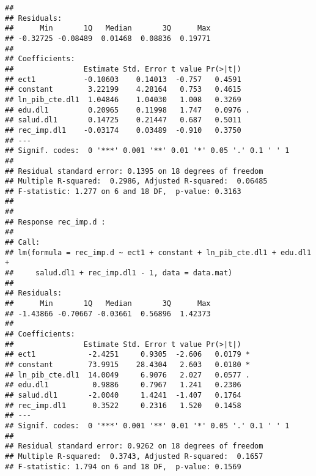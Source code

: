 \documentclass[]{book}
\newenvironment{Shaded}{\begin{snugshade}}{\end{snugshade}}
\newcommand{\KeywordTok}[1]{\textcolor[rgb]{0.13,0.29,0.53}{\textbf{#1}}}
\newcommand{\DecValTok}[1]{\textcolor[rgb]{0.00,0.00,0.81}{#1}}
\newcommand{\StringTok}[1]{\textcolor[rgb]{0.31,0.60,0.02}{#1}}
\newcommand{\OperatorTok}[1]{\textcolor[rgb]{0.81,0.36,0.00}{\textbf{#1}}}
\newcommand{\NormalTok}[1]{#1}
\theoremstyle{definition}
\theoremstyle{definition}
\theoremstyle{definition}
\theoremstyle{remark}
\begin{document}
\begin{verbatim}
## 
## Residuals:
##      Min       1Q   Median       3Q      Max 
## -0.32725 -0.08489  0.01468  0.08836  0.19771 
## 
## Coefficients:
##                Estimate Std. Error t value Pr(>|t|)  
## ect1           -0.10603    0.14013  -0.757   0.4591  
## constant        3.22199    4.28164   0.753   0.4615  
## ln_pib_cte.dl1  1.04846    1.04030   1.008   0.3269  
## edu.dl1         0.20965    0.11998   1.747   0.0976 .
## salud.dl1       0.14725    0.21447   0.687   0.5011  
## rec_imp.dl1    -0.03174    0.03489  -0.910   0.3750  
## ---
## Signif. codes:  0 '***' 0.001 '**' 0.01 '*' 0.05 '.' 0.1 ' ' 1
## 
## Residual standard error: 0.1395 on 18 degrees of freedom
## Multiple R-squared:  0.2986, Adjusted R-squared:  0.06485 
## F-statistic: 1.277 on 6 and 18 DF,  p-value: 0.3163
## 
## 
## Response rec_imp.d :
## 
## Call:
## lm(formula = rec_imp.d ~ ect1 + constant + ln_pib_cte.dl1 + edu.dl1 + 
##     salud.dl1 + rec_imp.dl1 - 1, data = data.mat)
## 
## Residuals:
##      Min       1Q   Median       3Q      Max 
## -1.43866 -0.70667 -0.03661  0.56896  1.42373 
## 
## Coefficients:
##                Estimate Std. Error t value Pr(>|t|)  
## ect1            -2.4251     0.9305  -2.606   0.0179 *
## constant        73.9915    28.4304   2.603   0.0180 *
## ln_pib_cte.dl1  14.0049     6.9076   2.027   0.0577 .
## edu.dl1          0.9886     0.7967   1.241   0.2306  
## salud.dl1       -2.0040     1.4241  -1.407   0.1764  
## rec_imp.dl1      0.3522     0.2316   1.520   0.1458  
## ---
## Signif. codes:  0 '***' 0.001 '**' 0.01 '*' 0.05 '.' 0.1 ' ' 1
## 
## Residual standard error: 0.9262 on 18 degrees of freedom
## Multiple R-squared:  0.3743, Adjusted R-squared:  0.1657 
## F-statistic: 1.794 on 6 and 18 DF,  p-value: 0.1569
\end{verbatim}

\begin{Shaded}
\end{Shaded}
\end{document}
